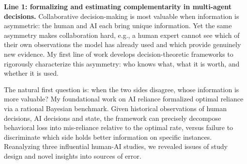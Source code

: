 
\textbf{Line 1: formalizing and estimating complementarity in multi-agent decisions.}
Collaborative decision-making is most valuable when information is asymmetric: the human and AI each bring unique information.
Yet the same asymmetry makes collaboration hard, e.g., a human expert cannot see which of their own observations the model has already used and which provide genuinely new evidence. 
My first line of work develops decision-theoretic frameworks to rigorously characterize this asymmetry: who knows what, what it is worth, and whether it is used.

The natural first question is: when the two sides disagree, whose information is more valuable?
My foundational work on AI reliance \cite{guo2024decision} formalized optimal reliance via a rational Bayesian benchmark.
Given historical observations of human decisions, AI decisions and state, the framework can precisely decompose behavioral loss into mis-reliance relative to the optimal rate, versus failure to discriminate which side holds better information on specific instances.
Reanalyzing three influential human-AI studies, we revealed issues of study design and novel insights into sources of error.

 
